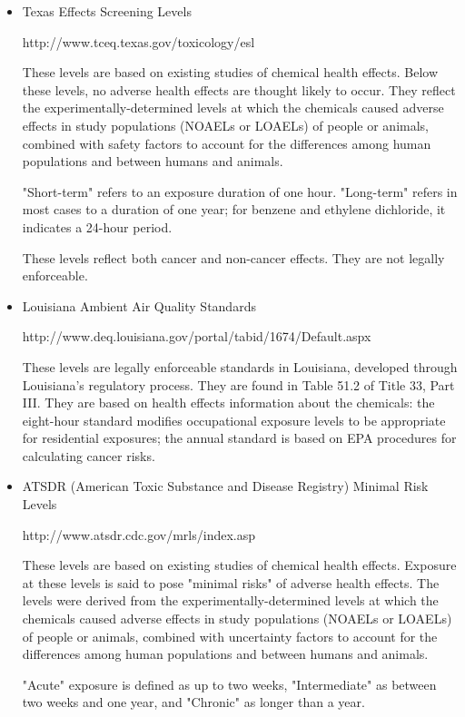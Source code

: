 \documentclass{article}
\begin{document}
\begin{itemize}

\item Texas Effects Screening Levels


http://www.tceq.texas.gov/toxicology/esl


These levels are based on existing studies of chemical health
effects. Below these levels, no adverse health effects are
thought likely to occur. They reflect the
experimentally-determined levels at which the chemicals caused
adverse effects in study populations (NOAELs or LOAELs) of people
or animals, combined with safety factors to account for the
differences among human populations and between humans and
animals.


"Short-term" refers to an exposure duration of one hour. "Long-term"
refers in most cases to a duration of one year; for benzene and
ethylene dichloride, it indicates a 24-hour period.


These levels reflect both cancer and non-cancer effects. They are not
legally enforceable.
\item Louisiana Ambient Air Quality Standards


http://www.deq.louisiana.gov/portal/tabid/1674/Default.aspx


These levels are legally enforceable standards in Louisiana, developed
through Louisiana's regulatory process. They are found in Table 51.2 of
Title 33, Part III.
They are based on health effects information about the chemicals: the
eight-hour standard modifies occupational exposure levels to be
appropriate for residential exposures; the annual standard is based on
EPA procedures for calculating cancer risks.
\item ATSDR (American Toxic Substance and Disease Registry) Minimal Risk Levels


http://www.atsdr.cdc.gov/mrls/index.asp


These levels are based on existing studies of chemical health
effects. Exposure at these levels is said to pose "minimal risks"
of adverse health effects. The levels were derived from the
experimentally-determined levels at which the chemicals caused
adverse effects in study populations (NOAELs or LOAELs) of people
or animals, combined with uncertainty factors to account for the
differences among human populations and between humans and
animals.


"Acute" exposure is defined as up to two weeks, "Intermediate" as
between two weeks and one year, and "Chronic" as longer than a year.



\end{itemize}
\end{document}
